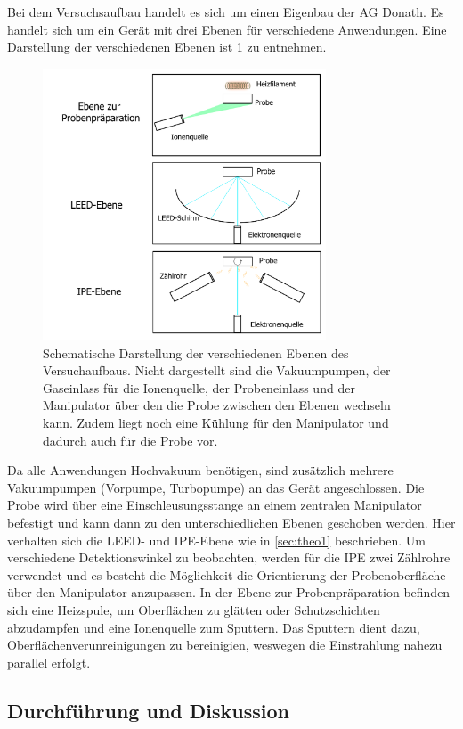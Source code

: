 Bei dem Versuchsaufbau handelt es sich um einen Eigenbau der AG Donath.
Es handelt sich um ein Gerät mit drei Ebenen für verschiedene Anwendungen.
Eine Darstellung der verschiedenen Ebenen ist \cref{fig_ipe_setup} zu entnehmen.
\begin{figure}[!ht]
    \centering
    \includegraphics[width=0.75\textwidth]{img/setup1.png}
    \caption{Schematische Darstellung der verschiedenen Ebenen des Versuchaufbaus.
    Nicht dargestellt sind die Vakuumpumpen, der Gaseinlass für die Ionenquelle, der Probeneinlass und der Manipulator über den die Probe zwischen den Ebenen wechseln kann. Zudem liegt noch eine Kühlung für den Manipulator und dadurch auch für die Probe vor.}
    \label{fig_ipe_setup}
\end{figure}
Da alle Anwendungen Hochvakuum benötigen, sind zusätzlich mehrere Vakuumpumpen (Vorpumpe, Turbopumpe) an das Gerät angeschlossen.
Die Probe wird über eine Einschleusungsstange an einem zentralen Manipulator befestigt und kann dann zu den unterschiedlichen Ebenen geschoben werden.
Hier verhalten sich die LEED- und IPE-Ebene wie in \cref{sec:theo1} beschrieben.
Um verschiedene Detektionswinkel zu beobachten, werden für die IPE zwei Zählrohre verwendet und es besteht die Möglichkeit die Orientierung der Probenoberfläche über den Manipulator anzupassen.
In der Ebene zur Probenpräparation befinden sich eine Heizspule, um Oberflächen zu glätten oder Schutzschichten abzudampfen und eine Ionenquelle zum Sputtern.
Das Sputtern dient dazu, Oberflächenverunreinigungen zu bereinigien, weswegen die Einstrahlung nahezu parallel erfolgt.

\subsection{Durchführung und Diskussion}

